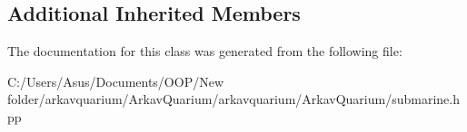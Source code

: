 \subsection*{Additional Inherited Members}


The documentation for this class was generated from the following file\+:\begin{DoxyCompactItemize}
\item 
C\+:/\+Users/\+Asus/\+Documents/\+O\+O\+P/\+New folder/arkavquarium/\+Arkav\+Quarium/arkavquarium/\+Arkav\+Quarium/submarine.\+hpp\end{DoxyCompactItemize}
